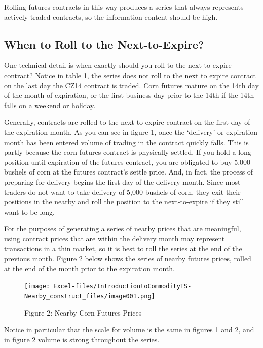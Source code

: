 \documentclass[
]{book}
\begin{document}
Rolling futures contracts in this way produces a series that always represents actively traded contracts, so the information content should be high.

\hypertarget{when-to-roll-to-the-next-to-expire}{%
\subsection{When to Roll to the Next-to-Expire?}\label{when-to-roll-to-the-next-to-expire}}

One technical detail is when exactly should you roll to the next to expire contract? Notice in table 1, the series does not roll to the next to expire contract on the last day the CZ14 contract is traded. Corn futures mature on the 14th day of the month of expiration, or the first business day prior to the 14th if the 14th falls on a weekend or holiday.

Generally, contracts are rolled to the next to expire contract on the first day of the expiration month. As you can see in figure 1, once the `delivery' or expiration month has been entered volume of trading in the contract quickly falls. This is partly because the corn futures contract is physically settled. If you hold a long position until expiration of the futures contract, you are obligated to buy 5,000 bushels of corn at the futures contract's settle price. And, in fact, the process of preparing for delivery begins the first day of the delivery month. Since most traders do not want to take delivery of 5,000 bushels of corn, they exit their positions in the nearby and roll the position to the next-to-expire if they still want to be long.

For the purposes of generating a series of nearby prices that are meaningful, using contract prices that are within the delivery month may represent transactions in a thin market, so it is best to roll the series at the end of the previous month. Figure 2 below shows the series of nearby futures prices, rolled at the end of the month prior to the expiration month.

\begin{figure}
\centering
\texttt{[image: Excel-files/IntroductiontoCommodityTS-Nearby\_construct\_files/image001.png]}
\caption{Figure 2: Nearby Corn Futures Prices}
\end{figure}

Notice in particular that the scale for volume is the same in figures 1 and 2, and in figure 2 volume is strong throughout the series.
\end{document}
